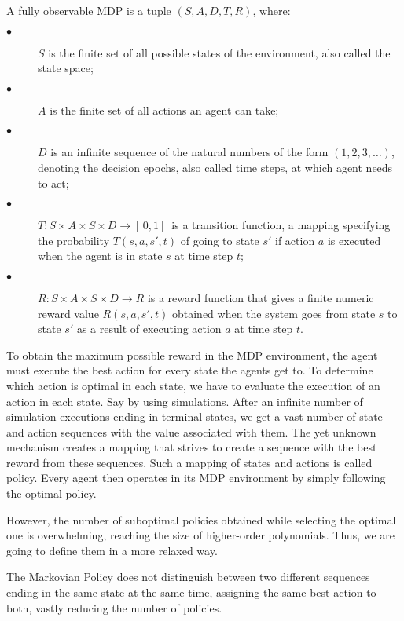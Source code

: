 \newpage
\begin{definition}\label{def:MDP}
A fully observable MDP is a tuple $(S, A, D, T, R)$, where:
\begin{description}
  \item[$\bullet$ ] $S$ is the finite set of all possible states of the environment, also called the state space;
  \item[$\bullet$ ] $A$ is the finite set of all actions an agent can take;
  \item[$\bullet$ ] $D$ is an infinite sequence of the natural numbers of the form $(1, 2, 3, \ldots)$, denoting the decision epochs, also called time steps, at which agent needs to act;
  \item[$\bullet$ ] $T : S \times A \times S \times D \rightarrow [ \,0, 1] \,$ is a transition function, a mapping specifying the probability $T(s, a, s', t)$ of going to state $s'$ if action $a$ is executed when the agent is in state $s$ at time step $t$;
  \item[$\bullet$ ] $R : S \times A \times S \times D \rightarrow R$ is a reward function that gives a finite numeric reward value $R(s, a, s', t)$ obtained when the system goes from state $s$ to state $s'$ as a result of executing action $a$ at time step $t$.
\end{description}
\end{definition}

To obtain the maximum possible reward in the MDP environment, the agent must execute the best action for every state the agents get to. To determine which action is optimal in each state, we have to evaluate the execution of an action in each state. Say by using simulations. After an infinite number of simulation executions ending in terminal states, we get a vast number of state and action sequences with the value associated with them. The yet unknown mechanism creates a mapping that strives to create a sequence with the best reward from these sequences. Such a mapping of states and actions is called policy. Every agent then operates in its MDP environment by simply following the optimal policy. 

However, the number of suboptimal policies obtained while selecting the optimal one is overwhelming, reaching the size of higher-order polynomials. Thus, we are going to define them in a more relaxed way.

The Markovian Policy does not distinguish between two different sequences ending in the same state at the same time, assigning the same best action to both, vastly reducing the number of policies.

